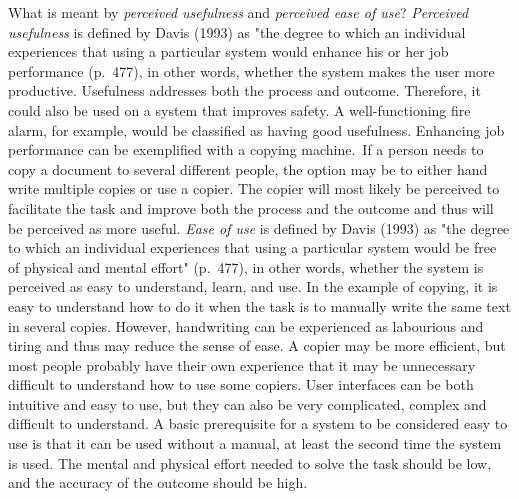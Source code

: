 \documentclass[
  12pt,
]{scrbook}
\begin{document}
What is meant by \emph{perceived usefulness} and \emph{perceived ease of use}? \emph{Perceived usefulness} is defined by Davis (1993) as "the degree to which an individual experiences that using a particular system would enhance his or her job performance (p.~477), in other words, whether the system makes the user more productive. Usefulness addresses both the process and outcome. Therefore, it could also be used on a system that improves safety. A well-functioning fire alarm, for example, would be classified as having good usefulness. Enhancing job performance can be exemplified with a copying machine.~If a person needs to copy a document to several different people, the option may be to either hand write multiple copies or use a copier. The copier will most likely be perceived to facilitate the task and improve both the process and the outcome and thus will be perceived as more useful. \emph{Ease of use} is defined by Davis (1993) as "the degree to which an individual experiences that using a particular system would be free of physical and mental effort" (p.~477), in other words, whether the system is perceived as easy to understand, learn, and use. In the example of copying, it is easy to understand how to do it when the task is to manually write the same text in several copies. However, handwriting can be experienced as labourious and tiring and thus may reduce the sense of ease. A copier may be more efficient, but most people probably have their own experience that it may be unnecessary difficult to understand how to use some copiers. User interfaces can be both intuitive and easy to use, but they can also be very complicated, complex and difficult to understand. A basic prerequisite for a system to be considered easy to use is that it can be used without a manual, at least the second time the system is used. The mental and physical effort needed to solve the task should be low, and the accuracy of the outcome should be high.
\end{document}
